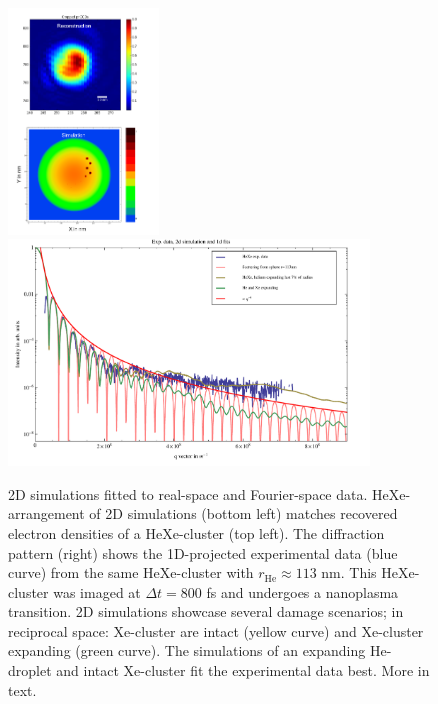 \begin{figure}
	\centering
		\includegraphics[height=6.0cm]{images/results/HeXe-densities-113-05-doping-and-reconstruction.png}
		\includegraphics[height=6.0cm]{images/results/HeXe-cluster-113-0-5-doping.pdf}
	\caption[Simulation and exp. data: Structural damage in He-droplet.]{2D simulations fitted to real-space and Fourier-space data. HeXe-arrangement of 2D simulations (bottom left) matches recovered electron densities of a HeXe-cluster (top left). The diffraction pattern (right) shows the 1D-projected experimental data (blue curve) from the same HeXe-cluster with $r_{\text{He}}\approx 113$ nm. This HeXe-cluster was imaged at $\Delta t=800$ fs and undergoes a nanoplasma transition. 2D simulations showcase several damage scenarios; in reciprocal space: Xe-cluster are intact (yellow curve) and Xe-cluster expanding (green curve). The simulations of an expanding He-droplet and intact Xe-cluster fit the experimental data best. More in text.}
	\label{fig:HeXe-cluster-113-0.5}
\end{figure}
